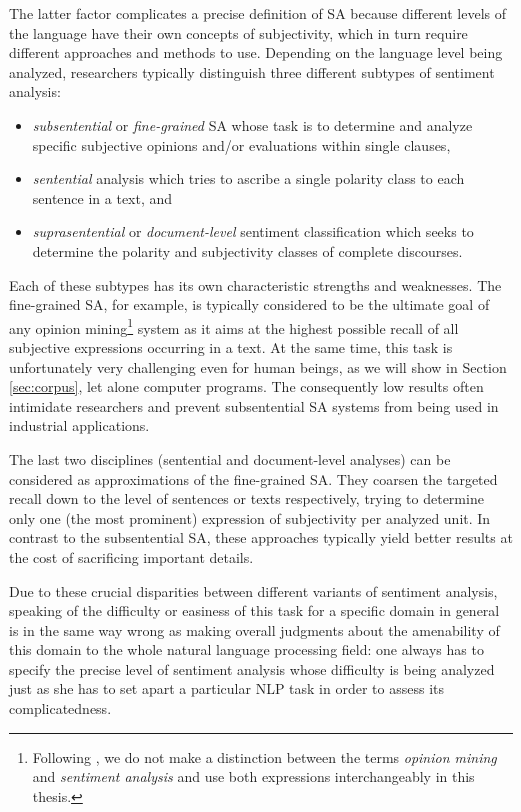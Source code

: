 The latter factor complicates a precise definition of SA because
different levels of the language have their own concepts of
subjectivity, which in turn require different approaches and methods
to use.  Depending on the language level being analyzed, researchers
typically distinguish three different subtypes of sentiment analysis:
\begin{itemize}
  \item\emph{subsentential} or \emph{fine-grained} SA whose task is to
    determine and analyze specific subjective opinions and/or
    evaluations within single clauses,
  \item\emph{sentential} analysis which tries to ascribe a single
    polarity class to each sentence in a text, and
  \item\emph{suprasentential} or \emph{document-level} sentiment
    classification which seeks to determine the polarity and
    subjectivity classes of complete discourses.
\end{itemize}

Each of these subtypes has its own characteristic strengths and
weaknesses.  The fine-grained SA, for example, is typically considered
to be the ultimate goal of any opinion mining\footnote{Following
  \citet{Liu:12}, we do not make a distinction between the terms
  \emph{opinion mining} and \emph{sentiment analysis} and use both
  expressions interchangeably in this thesis.}  system as it aims at
the highest possible recall of all subjective expressions occurring in
a text.  At the same time, this task is unfortunately very challenging
even for human beings, as we will show in Section \ref{sec:corpus},
let alone computer programs.  The consequently low results often
intimidate researchers and prevent subsentential SA systems from being
used in industrial applications.

The last two disciplines (sentential and document-level analyses) can
be considered as approximations of the fine-grained SA.  They coarsen
the targeted recall down to the level of sentences or texts
respectively, trying to determine only one (the most prominent)
expression of subjectivity per analyzed unit.  In contrast to the
subsentential SA, these approaches typically yield better results at
the cost of sacrificing important details.

Due to these crucial disparities between different variants of
sentiment analysis, speaking of the difficulty or easiness of this
task for a specific domain in general is in the same way wrong as
making overall judgments about the amenability of this domain to the
whole natural language processing field: one always has to specify the
precise level of sentiment analysis whose difficulty is being analyzed
just as she has to set apart a particular NLP task in order to assess
its complicatedness.

